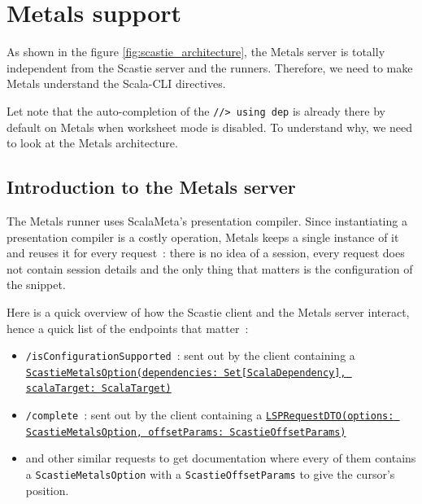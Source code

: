 \documentclass{article}
\begin{document}
\section{Metals support}

As shown in the figure \ref{fig:scastie_architecture}, the Metals server is totally independent from the Scastie server and the runners. Therefore, we need to make Metals understand the Scala-CLI directives.

Let note that the auto-completion of the \lstinline{//> using dep} is already there by default on Metals when worksheet mode is disabled. To understand why, we need to look at the Metals architecture.

\subsection{Introduction to the Metals server}

The Metals runner uses ScalaMeta's presentation compiler. Since instantiating a presentation compiler is a costly operation, Metals keeps a single instance of it and reuses it for every request~: there is no idea of a session, every request does not contain session details and the only thing that matters is the configuration of the snippet.

Here is a quick overview of how the Scastie client and the Metals server interact, hence a quick list of the endpoints that matter~:

\begin{itemize}
    \item \lstinline{/isConfigurationSupported}~: sent out by the client containing a \href{https://github.com/Maeeen/scastie/blob/main/api/src/main/scala/com.olegych.scastie.api/ApiModels.scala#LL132C101-L132C101}{\lstinline{ScastieMetalsOption(dependencies: Set[ScalaDependency], scalaTarget: ScalaTarget)}}
    
    \item \lstinline{/complete}~: sent out by the client containing a \href{https://github.com/Maeeen/scastie/blob/23e0fa998565a37d8ecfa36fa64d1268a9c1d12c/api/src/main/scala/com.olegych.scastie.api/ApiModels.scala#L169}{\lstinline{LSPRequestDTO(options: ScastieMetalsOption, offsetParams: ScastieOffsetParams)}}
    \item and other similar requests to get documentation where every of them contains a \lstinline{ScastieMetalsOption} with a \lstinline{ScastieOffsetParams} to give the cursor's position.
\end{itemize}
\end{document}
